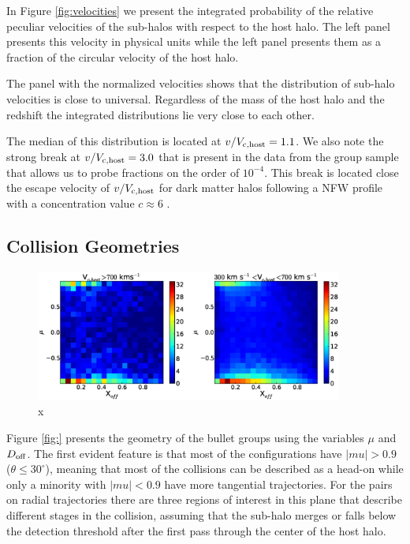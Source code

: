 \documentclass{emulateapj}
\begin{document}
In Figure \ref{fig:velocities} we present the integrated probability
of the relative peculiar velocities of the sub-halos with respect to
the host halo. The left panel presents this velocity in physical units
while the left panel presents them as a fraction of the circular
velocity of the host halo.  


The panel with the normalized velocities shows that the distribution
of sub-halo velocities is close to universal. Regardless of the mass
of the host halo and the redshift the integrated distributions lie
very close to each other.  


The median of this distribution is located at $v/V_{\rm
  c,host}=1.1$. We also note the strong break at $v/V_{\rm
  c,host}=3.0$ that is present in the data from the group sample that
allows us to probe fractions on the order of $10^{-4}$.  This break is
located close the escape velocity of $v/V_{\rm c,host}$ for dark
matter halos following a NFW profile with a concentration value
$c\approx 6$ \citep{Hayashi2006}.  



\subsection{Collision Geometries}
\label{fig:geometry}

\begin{figure}
\begin{center}
\includegraphics[width=0.9\textwidth]{Figures_eps/figure_4.eps}
\end{center}
\caption{x}
\label{fig:geometry}
\end{figure}


Figure \ref{fig:} presents the geometry of the bullet groups using the 
variables $\mu$ and $D_{\rm off}$. The first evident feature is that
most of the configurations have $|mu|>0.9$ ($\theta\leq 30^{\circ}$),
meaning that most of the collisions can be described as a head-on while
only a minority with $|mu|<0.9$ have more tangential trajectories. For
the pairs on radial trajectories there are three regions of interest
in this plane that describe different stages in the collision,
assuming that the sub-halo merges or falls below the detection
threshold after the first pass through the center of the host halo.
\end{document}
